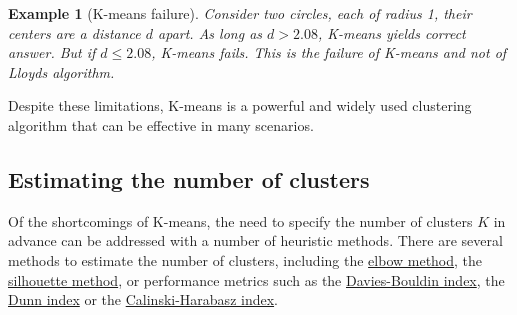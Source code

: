 \documentclass{article}[11pt]
\newtheorem{ex}{Example}
\begin{document}
\begin{ex}[K-means failure]\label{ex:kmeans-failure}
Consider two circles, each of radius 1, their centers are a distance $d$ apart.
As long as $d > 2.08$, K-means yields correct answer. But if $d\leq{2.08}$, K-means fails.
This is the failure of K-means and not of Lloyds algorithm.
\end{ex}

Despite these limitations, K-means is a powerful and widely used clustering algorithm that can be effective in many scenarios.

\subsection{Estimating the number of clusters}
Of the shortcomings of K-means, the need to specify the number of clusters $K$ in advance can be addressed with a number of heuristic methods. 
There are several methods to estimate the number of clusters, including the \href{https://en.wikipedia.org/wiki/Elbow_method_(clustering)}{elbow method}, 
the \href{https://en.wikipedia.org/wiki/Silhouette_(clustering)}{silhouette method}, or performance metrics 
such as the \href{https://en.wikipedia.org/wiki/Davies%E2%80%93Bouldin_index}{Davies-Bouldin index}, the \href{https://en.wikipedia.org/wiki/Dunn_index}{Dunn index}
or the \href{https://en.wikipedia.org/wiki/Calinski%E2%80%93Harabasz_index}{Calinski-Harabasz index}.
\end{document}
